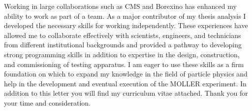 \documentclass[10pt,a4paper,sans,english]{moderncv}        %
\begin{document}
Working in large collaborations such as CMS and Borexino has enhanced my ability to work as part of a team. As a major contributor of my thesis analysis I developed the necessary skills for working independently.  These experiences have allowed me to collaborate effectively with scientists, engineers, and technicians from different institutional backgrounds and provided a pathway to developing strong programming skills in addition to expertise in the design, construction, and commissioning of testing apparatus.  I am eager to use these skills as a firm foundation on which to expand my knowledge in the field of particle physics and help in the development and eventual execution of the MOLLER experiment.  In addition to this letter you will find my curriculum vitae attached. Thank you for your time and consideration.

\makeletterclosing
	

	
	
\end{document}
